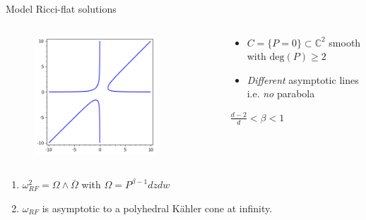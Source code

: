 \documentclass{beamer}
\newcommand{\C}{\mathbb{C}}
\begin{document}
\begin{frame}{Model Ricci-flat solutions}
\begin{columns}	
	\begin{column}{0.48\textwidth}
		\begin{figure}
			\includegraphics[width=0.8\textwidth,height=0.8\textheight,keepaspectratio]{cubic}
		\end{figure}
	\end{column}
	\begin{column}{0.48\textwidth}
		\begin{itemize}
			\item \(C=\{P=0\} \subset \C^2\) smooth with \(\mbox{deg}(P)\geq 2\)
			\item \emph{Different} asymptotic lines \\
			i.e. \emph{no} parabola
		\end{itemize}
	\begin{center}
		\begin{minipage}{0.4\textwidth}
			\begin{block}{}
				\(\frac{d-2}{d}<\beta<1\)
			\end{block}
		\end{minipage}
	\end{center}
	\end{column}
\end{columns}	
\pause
\begin{theorem}[de Borbon, 2017]
	\begin{enumerate}
		\item \(\omega_{RF}^2 = \Omega \wedge \bar{\Omega}\) with \(\Omega = P^{\beta-1} dz dw \) 
		\item \(\omega_{RF}\) is asymptotic to a polyhedral K\"ahler cone at infinity.
	\end{enumerate}
\end{theorem}
\end{frame}
\end{document}

